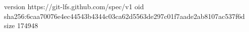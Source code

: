 version https://git-lfs.github.com/spec/v1
oid sha256:6caa70076e4ec44543b4344c03ca62d5563de297c01f7aade2ab8107ac537f6d
size 174948
